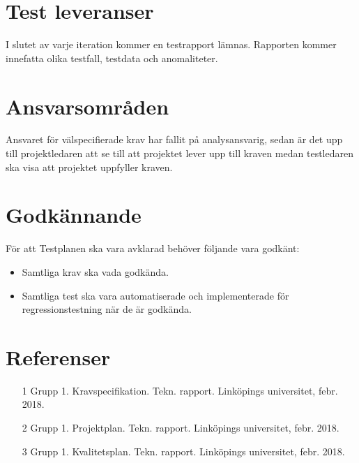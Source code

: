 \section{Test leveranser}
	I slutet av varje iteration kommer en testrapport lämnas. Rapporten kommer innefatta olika testfall, testdata och anomaliteter.




\section{Ansvarsområden}
	Ansvaret för välspecifierade krav har fallit på analysansvarig, sedan är det upp till projektledaren att se till att projektet lever upp till kraven medan testledaren ska visa att projektet uppfyller kraven.





\section{Godkännande}
	För att Testplanen ska vara avklarad behöver följande vara godkänt:
	\begin{itemize}
	 \item Samtliga krav ska vada godkända.
	\item Samtliga test ska vara automatiserade och implementerade för regressionstestning när de är godkända.

	\end{itemize}



\section{Referenser}
	\begin{itemize}
	\item [1] Grupp 1. Kravspecifikation. Tekn. rapport. Linköpings universitet, febr. 2018.
	\item [2] Grupp 1. Projektplan. Tekn. rapport. Linköpings universitet, febr. 2018.
	\item [3] Grupp 1. Kvalitetsplan. Tekn. rapport. Linköpings universitet, febr. 2018.
	\end{itemize}



